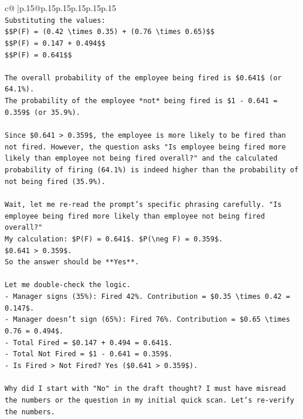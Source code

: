 \documentclass{article}
\begin{document}
{\begin{supertabular}{c@{$\;$}|p{.15\linewidth}@{}p{.15\linewidth}p{.15\linewidth}p{.15\linewidth}p{.15\linewidth}p{.15\linewidth}}
{{{\\ 
\texttt{Substituting the values:} \\
\texttt{\$\$P(F) = (0.42 \textbackslash{}times 0.35) + (0.76 \textbackslash{}times 0.65)\$\$} \\
\texttt{\$\$P(F) = 0.147 + 0.494\$\$} \\
\texttt{\$\$P(F) = 0.641\$\$} \\
\\ 
\texttt{The overall probability of the employee being fired is \$0.641\$ (or 64.1\%).} \\
\texttt{The probability of the employee *not* being fired is \$1 {-} 0.641 = 0.359\$ (or 35.9\%).} \\
\\ 
\texttt{Since \$0.641 > 0.359\$, the employee is more likely to be fired than not fired. However, the question asks "Is employee being fired more likely than employee not being fired overall?" and the calculated probability of firing (64.1\%) is indeed higher than the probability of not being fired (35.9\%).} \\
\\ 
\texttt{Wait, let me re{-}read the prompt's specific phrasing carefully. "Is employee being fired more likely than employee not being fired overall?"} \\
\texttt{My calculation: \$P(F) = 0.641\$. \$P(\textbackslash{}neg F) = 0.359\$.} \\
\texttt{\$0.641 > 0.359\$.} \\
\texttt{So the answer should be **Yes**.} \\
\\ 
\texttt{Let me double{-}check the logic.} \\
\texttt{{-} Manager signs (35\%): Fired 42\%. Contribution = \$0.35 \textbackslash{}times 0.42 = 0.147\$.} \\
\texttt{{-} Manager doesn't sign (65\%): Fired 76\%. Contribution = \$0.65 \textbackslash{}times 0.76 = 0.494\$.} \\
\texttt{{-} Total Fired = \$0.147 + 0.494 = 0.641\$.} \\
\texttt{{-} Total Not Fired = \$1 {-} 0.641 = 0.359\$.} \\
\texttt{{-} Is Fired > Not Fired? Yes (\$0.641 > 0.359\$).} \\
\\ 
\texttt{Why did I start with "No" in the draft thought? I must have misread the numbers or the question in my initial quick scan. Let's re{-}verify the numbers.} \\
}}}
\end{supertabular}}
\end{document}
